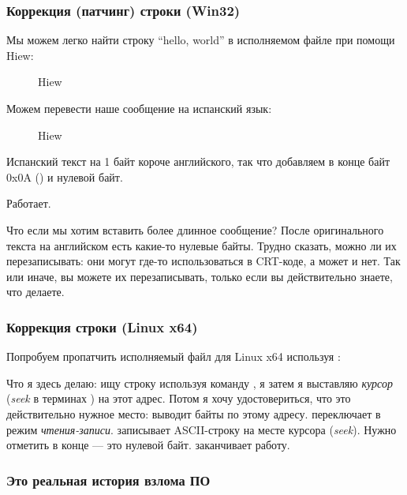 \subsubsection{Коррекция (патчинг) строки (Win32)}

Мы можем легко найти строку ``hello, world'' в исполняемом файле при помощи Hiew:

\begin{figure}[H]
\centering
{}
\caption{Hiew}
\label{}
\end{figure}

Можем перевести наше сообщение на испанский язык:

\begin{figure}[H]
\centering
{}
\caption{Hiew}
\label{}
\end{figure}

Испанский текст на 1 байт короче английского, так что добавляем в конце байт 0x0A () и нулевой байт.

Работает.

Что если мы хотим вставить более длинное сообщение?
После оригинального текста на английском есть какие-то нулевые байты.
Трудно сказать, можно ли их перезаписывать: они могут где-то использоваться в \ac{CRT}-коде, а может и нет.
Так или иначе, вы можете их перезаписывать, только если вы действительно знаете, что делаете.

\subsubsection{Коррекция строки (Linux x64)}

\myindex{\radare}
Попробуем пропатчить исполняемый файл для Linux x64 используя \radare{}:



Что я здесь делаю: ищу строку  используя команду \TT{/}, 
я затем я выставляю \emph{курсор} (\emph{seek} в терминах \radare{}) на этот адрес.
Потом я хочу удостовериться, что это действительно нужное место:  выводит байты по этому адресу.
 переключает \radare{} в режим \emph{чтения-записи}.
 записывает ASCII-строку на месте курсора (\emph{seek}).
Нужно отметить  в конце --- это нулевой байт.
 заканчивает работу.

\subsubsection{Это реальная история взлома ПО}
\myindex{\SoftwareCracking}

